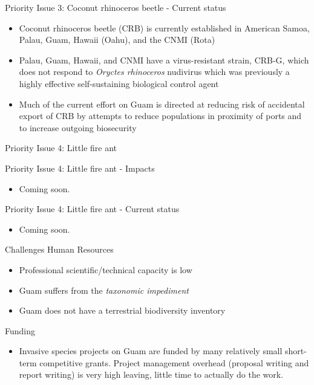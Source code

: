 \documentclass[]{beamer}
\begin{document}
\begin{frame}{Priority Issue 3: Coconut rhinoceros beetle - Current status}
	\begin{itemize}
		\item Coconut rhinoceros beetle (CRB) is currently established in American Samoa, Palau, Guam, Hawaii (Oahu), and the CNMI (Rota)
		\item Palau, Guam, Hawaii, and CNMI have a virus-resistant strain, CRB-G, which does not respond to \textit{Oryctes rhinoceros} nudivirus which was previously a highly effective self-sustaining biological control agent
		\item Much of the current effort on Guam is directed at reducing risk of accidental export of CRB by attempts to reduce populations in proximity of ports and to increase outgoing biosecurity 
	\end{itemize}
\end{frame}

\begin{frame}{Priority Issue 4: Little fire ant}	
	\begin{figure}
	\end{figure}
\end{frame}

\begin{frame}{Priority Issue 4: Little fire ant - Impacts}	
	\begin{itemize}
		\item Coming soon.
	\end{itemize}
\end{frame}

\begin{frame}{Priority Issue 4: Little fire ant - Current status}	
	\begin{itemize}
		\item Coming soon.
	\end{itemize}
\end{frame}

\begin{frame}{Challenges}
	Human Resources
	\begin{itemize}
		\item Professional scientific/technical capacity is low
		\item Guam suffers from the \textit{taxonomic impediment}
		\item Guam does not have a terrestrial biodiversity inventory
	\end{itemize}
	Funding
	\begin{itemize}
		\item Invasive species projects on Guam are funded by many relatively small short-term competitive grants. Project management overhead (proposal writing and report writing) is very high leaving, little time to actually do the work.
	\end{itemize}
\end{frame}
\end{document}
